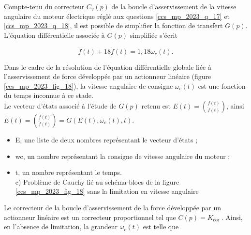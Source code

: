 Compte-tenu du correcteur $C_{v}(p)$ de la boucle d'asservissement de la vitesse angulaire du moteur électrique réglé aux questions \ref{ccs_mp_2023_q_17} et \ref{ccs_mp_2023_q_18}, il est possible de simplifier la fonction de transfert $G(p)$. L'équation différentielle associée à $G(p)$ simplifiée s'écrit

$$
\ddot{f}(t)+18 \dot{f}(t)=1,18 \omega_{c}(t) .
$$

Dans le cadre de la résolution de l'équation différentielle globale liée à l'asservissement de force développée par un actionneur linéaire (figure \ref{ccs_mp_2023_fig_18}), la vitesse angulaire de consigne $\omega_{c}(t)$ est une fonction du temps inconnue à ce stade.\\
Le vecteur d'états associé à l'étude de $G(p)$ retenu est $E(t)=\binom{f(t)}{\dot{f}(t)}$, ainsi $\dot{E}(t)=\binom{\dot{f}(t)}{\ddot{f}(t)}=G\left(E(t), \omega_{c}(t), t\right)$.\\
\ifprof
\begin{corrige}
\end{corrige}
\else
\fi


\begin{itemize}
  \item E, une liste de deux nombres représentant le vecteur d'états ;
  \item wc, un nombre représentant la consigne de vitesse angulaire du moteur ;
  \item t, un nombre représentant le temps.\\
c) Problème de Cauchy lié au schéma-blocs de la figure \ref{ccs_mp_2023_fig_18} sans la limitation en vitesse angulaire
\end{itemize}
\ifprof
\begin{corrige}
\end{corrige}
\else
\fi



Le correcteur de la boucle d'asservissement de la force développée par un actionneur linéaire est un correcteur proportionnel tel que $C(p)=K_{\text {cor }}$. Ainsi, en l'absence de limitation, la grandeur $\omega_{c}(t)$ est telle que

